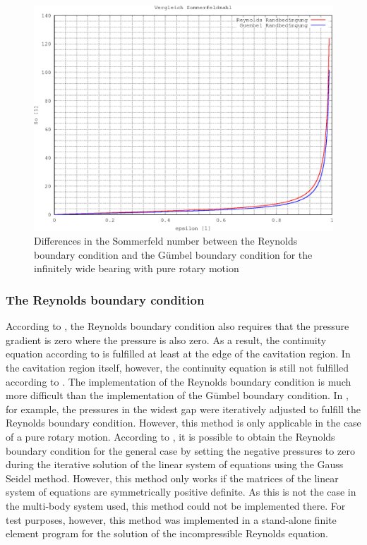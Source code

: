 \begin{figure}[htb]
\centering
\includegraphics[width=0.5\linewidth]{fig_h300}
\caption[Differences between Reynolds boundary condition and G\"umbel boundary condition]{Differences in the Sommerfeld number between the Reynolds boundary condition and the G\"umbel boundary condition for the infinitely wide bearing with pure rotary motion}
\label{fig:h300}
\end{figure}

\subsubsection{The Reynolds boundary condition}
According to \cite{Butenschoen-1976}, the Reynolds boundary condition also requires that the pressure gradient is zero where the pressure is also zero. As a result, the continuity equation according to \cite{Butenschoen-1976} is fulfilled at least at the edge of the cavitation region. In the cavitation region itself, however, the continuity equation is still not fulfilled according to \cite{DIRKBARTEL2010}. The implementation of the Reynolds boundary condition is much more difficult than the implementation of the G\"umbel boundary condition. In \cite{Butenschoen-1976}, for example, the pressures in the widest gap were iteratively adjusted to fulfill the Reynolds boundary condition. However, this method is only applicable in the case of a pure rotary motion. According to \cite{Bayada-2013}, it is possible to obtain the Reynolds boundary condition for the general case by setting the negative pressures to zero during the iterative solution of the linear system of equations using the Gauss Seidel method. However, this method only works if the matrices of the linear system of equations are symmetrically positive definite. As this is not the case in the multi-body system used, this method could not be implemented there. For test purposes, however, this method was implemented in a stand-alone finite element program for the solution of the incompressible Reynolds equation.

